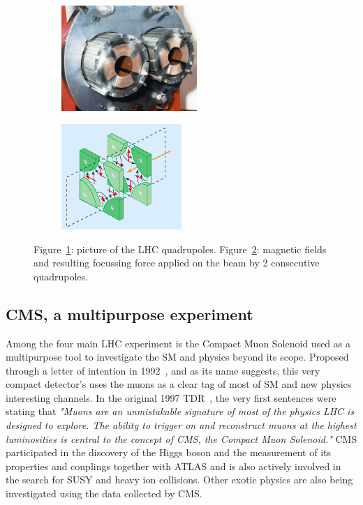 	\begin{figure}[H]
		\begin{subfigure}{0.5\linewidth}
			\centering
			\includegraphics[height = 4cm]{fig/chapt2/LHC-quadrupole.jpg}
			\caption{\label{fig:LHCQuadrupole:A}}
		\end{subfigure}
		\begin{subfigure}{0.5\linewidth}
			\centering
			\includegraphics[height = 4cm]{fig/chapt2/LHC-quadrupole-field.png}
			\caption{\label{fig:LHCQuadrupole:B}}
		\end{subfigure}
		\caption{\label{fig:LHCQuadrupole} Figure~\ref{fig:LHCQuadrupole:A}: picture of the LHC quadrupoles. Figure~\ref{fig:LHCQuadrupole:B}: magnetic fields and resulting focussing force applied on the beam by 2 consecutive quadrupoles.}
	\end{figure}

	\subsection{CMS, a multipurpose experiment}
	\label{chapt2:ssec:CMS}
	
	Among the four main LHC experiment is the Compact Muon Solenoid used as a multipurpose tool to investigate the SM and physics beyond its scope. Proposed through a letter of intention in 1992~\cite{CMSLOI}, and as its name suggests, this very compact detector's uses the muons as a clear tag of most of SM and new physics interesting channels. In the original 1997 \acf{TDR}~\cite{MUONTDR}, the very first sentences were stating that \textit{"Muons are an unmistakable signature of most of the physics LHC is designed to explore. The ability to trigger on and reconstruct muons at the highest luminosities is central to the concept of CMS, the Compact Muon Solenoid."} CMS participated in the discovery of the Higgs boson and the measurement of its properties and couplings together with ATLAS and is also actively involved in the search for SUSY and heavy ion collisions. Other exotic physics are also being investigated using the data collected by CMS.
	
